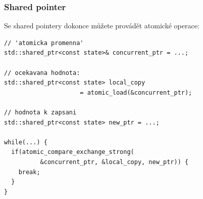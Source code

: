 \documentclass[usenames,dvipsnames,9pt]{beamer}
\begin{document}
\begin{frame}
\begin{center}
  \end{center}
\end{frame}

\begin{frame}[fragile]
  \frametitle{Shared pointer}

  Se shared pointery dokonce můžete provádět atomické operace:
  \begin{verbatim}
// 'atomicka promenna'
std::shared_ptr<const state>& concurrent_ptr = ...;

// ocekavana hodnota:
std::shared_ptr<const state> local_copy
                     = atomic_load(&concurrent_ptr);

// hodnota k zapsani
std::shared_ptr<const state> new_ptr = ...;

while(...) {
  if(atomic_compare_exchange_strong(
          &concurrent_ptr, &local_copy, new_ptr)) {
    break;
  }
}
  \end{verbatim}
\end{frame}
\end{document}
